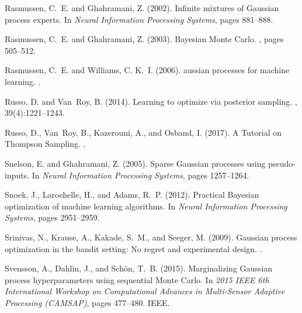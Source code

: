 \documentclass[12pt,letterpaper]{article}
\begin{document}
\begin{thebibliography}{}
Rasmussen, C.~E. and Ghahramani, Z. (2002).
\newblock Infinite mixtures of {G}aussian process experts.
\newblock In {\em Neural Information Processing Systems}, pages 881--888.

Rasmussen, C.~E. and Ghahramani, Z. (2003).
\newblock Bayesian {M}onte {C}arlo.
, pages
  505--512.

Rasmussen, C.~E. and Williams, C. K.~I. (2006).
aussian processes for machine learning.
.

Russo, D. and Van~Roy, B. (2014).
\newblock Learning to optimize via posterior sampling.
, 39(4):1221--1243.

Russo, D., Van~Roy, B., Kazerouni, A., and Osband, I. (2017).
\newblock A {T}utorial on {T}hompson {S}ampling.
.

Snelson, E. and Ghahramani, Z. (2005).
\newblock Sparse {G}aussian processes using pseudo-inputs.
\newblock In {\em Neural Information Processing Systems}, pages 1257--1264.

Snoek, J., Larochelle, H., and Adams, R.~P. (2012).
\newblock Practical {B}ayesian optimization of machine learning algorithms.
\newblock In {\em Neural Information Processing Systems}, pages 2951--2959.

Srinivas, N., Krause, A., Kakade, S.~M., and Seeger, M. (2009).
\newblock Gaussian process optimization in the bandit setting: No regret and
  experimental design.
.

Svensson, A., Dahlin, J., and Sch{\"o}n, T.~B. (2015).
\newblock Marginalizing {G}aussian process hyperparameters using sequential
  {M}onte {C}arlo.
\newblock In {\em 2015 IEEE 6th International Workshop on Computational
  Advances in Multi-Sensor Adaptive Processing (CAMSAP)}, pages 477--480. IEEE.


\end{thebibliography}
\end{document}
